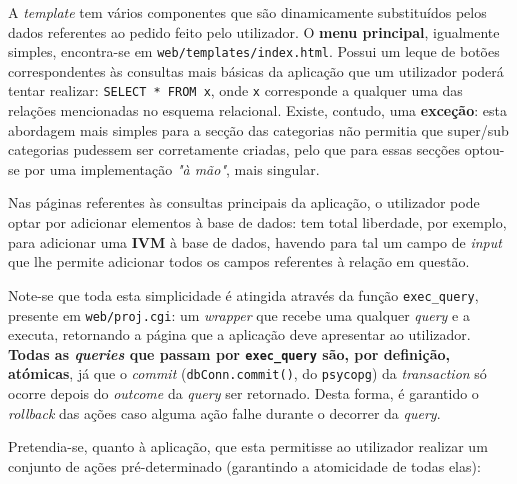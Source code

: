 \documentclass[12pt,a4paper]{article}
\begin{document}
A \textit{template} tem vários componentes que são dinamicamente substituídos
pelos dados referentes ao pedido feito pelo utilizador. O \textbf{menu principal},
igualmente simples, encontra-se em \texttt{web/templates/index.html}. Possui um
leque de botões correspondentes às consultas mais básicas da aplicação que um
utilizador poderá tentar realizar: \texttt{SELECT * FROM x}, onde \texttt{x} corresponde a qualquer
uma das relações mencionadas no esquema relacional. Existe, contudo, uma \textbf{exceção}:
esta abordagem mais simples para a secção das categorias não permitia que
super/sub categorias pudessem ser corretamente criadas, pelo que para essas secções
optou-se por uma implementação \textit{"à mão"}, mais singular.

Nas páginas referentes às consultas principais da aplicação,
o utilizador pode optar por adicionar elementos à base de dados: tem total
liberdade, por exemplo, para adicionar uma \textbf{IVM} à base de dados,
havendo para tal um campo de \textit{input} que lhe permite adicionar todos os
campos referentes à relação em questão.

Note-se que toda esta simplicidade é atingida através da função \texttt{exec\_query},
presente em \texttt{web/proj.cgi}: um \textit{wrapper} que recebe uma qualquer
\textit{query} e a executa, retornando a página que a aplicação deve apresentar
ao utilizador. \textbf{Todas as \textit{queries} que passam por \texttt{exec\_query} são,
  por definição, atómicas}, já que o \textit{commit} (\texttt{dbConn.commit()}, do \texttt{psycopg})
da \textit{transaction} só ocorre depois do \textit{outcome} da \textit{query}
ser retornado. Desta forma, é garantido o \textit{rollback} das ações caso alguma
ação falhe durante o decorrer da \textit{query}.

\vspace*{0.5cm}

Pretendia-se, quanto à aplicação, que esta permitisse ao utilizador realizar um conjunto
de ações pré-determinado (garantindo a atomicidade de todas elas):
\end{document}
